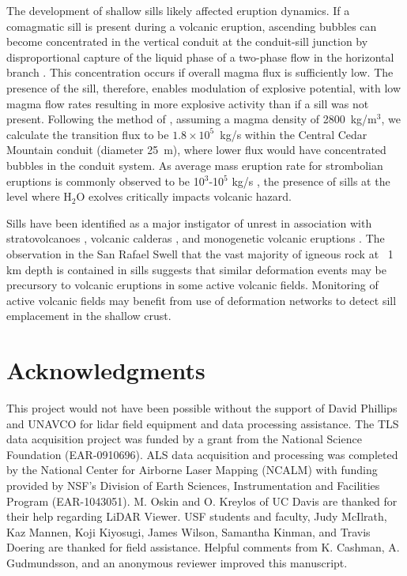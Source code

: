 The development of shallow sills likely affected eruption dynamics. If a comagmatic sill is present during a volcanic eruption, ascending bubbles can become concentrated in the vertical conduit at the conduit-sill junction by disproportional capture of the liquid phase of a two-phase flow in the horizontal branch \citep{conte2000experimental}. This concentration occurs if overall magma flux is sufficiently low. The presence of the sill, therefore, enables modulation of explosive potential, with low magma flow rates resulting in more explosive activity than if a sill was not present. Following the method of \citet{pioli2009controls}, assuming a magma density of 2800~kg/m$^3$, we calculate the transition flux to be $1.8\times 10^5$~kg/s within the Central Cedar Mountain conduit (diameter 25~m), where lower flux would have concentrated bubbles in the conduit system. As average mass eruption rate for strombolian eruptions is commonly observed to be 10$^3$-10$^5$ kg/s \citep{pioli2009controls}, the presence of sills at the level where H$_2$O exolves critically impacts volcanic hazard.

Sills have been identified as a major instigator of unrest in association with stratovolcanoes \citep[e.g.]{biggs2010stratovolcano,tarasewicz2012magma}, volcanic calderas \citep{macedonio2014sill}, and monogenetic volcanic eruptions \citep{erlund2010compositional}. The observation in the San Rafael Swell that the vast majority of igneous rock at ~1 km depth is contained in sills suggests that similar deformation events may be precursory to volcanic eruptions in some active volcanic fields. Monitoring of active volcanic fields may benefit from use of deformation networks to detect sill emplacement in the shallow crust.



\section{Acknowledgments}
This project would not have been possible without the support of David Phillips and UNAVCO for lidar field equipment and data processing assistance. The TLS data acquisition project was funded by a grant from the National Science Foundation (EAR-0910696). ALS data acquisition and processing was completed by the National Center for Airborne Laser Mapping (NCALM) with funding provided by NSF’s Division of Earth Sciences, Instrumentation and Facilities Program (EAR-1043051). M. Oskin and O. Kreylos of UC Davis are thanked for their help regarding LiDAR Viewer. USF students and faculty, Judy McIlrath, Kaz Mannen, Koji Kiyosugi, James Wilson, Samantha Kinman, and Travis Doering are thanked for field assistance. Helpful comments from K. Cashman, A. Gudmundsson, and an anonymous reviewer improved this manuscript.

